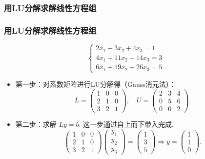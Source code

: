 \subsubsection{用LU分解求解线性方程组}
\begin{frame}\frametitle{用LU分解求解线性方程组}
\begin{example}[用LU分解求解线性方程组]
\[\begin{cases}
2x_1 + 3x_2 + 4x_3 = 1 \\
4x_1 + 11x_2 + 14x_3 = 3 \\
6x_1 + 19x_2 + 26x_3 = 5.
\end{cases}\]
\end{example}
\begin{itemize}
\item 第一步：对系数矩阵进行LU分解得（Gauss消元法）：
\[L = \begin{pmatrix}
1 & 0 & 0 \\
2 & 1 & 0 \\
3 & 2 & 1
\end{pmatrix}, \quad
U = \begin{pmatrix}
2 & 3 & 4 \\
0 & 5 & 6 \\
0 & 0 & 2
\end{pmatrix}.\]
\pp

\item 第二步：求解 $Ly = b$. 这一步通过自上而下带入完成.
\[\begin{pmatrix}
1 & 0 & 0 \\
2 & 1 & 0 \\
3 & 2 & 1
\end{pmatrix}
\begin{pmatrix}y_1 \\y_2 \\y_3\end{pmatrix}
=
\begin{pmatrix}1 \\3 \\5\end{pmatrix}
\Rightarrow y = \begin{pmatrix} 1 \\ 1 \\ 0 \end{pmatrix}.\]
\pp


\end{itemize}
\end{frame}
